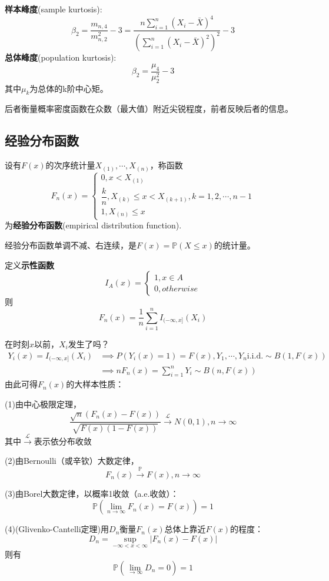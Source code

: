 \documentclass{ctexbook}
\begin{document}
\begin{definition}
    \textbf{样本峰度}(sample kurtosis):
    $$\hat{\beta}_2=\frac{m_{n,4}}{m_{n,2}^{2}}-3=\frac{n\sum_{i=1}^{n}(X_i-\bar{X})^4}{\left(\sum_{i=1}^n(X_i-\bar{X})^2\right)^{2}}-3$$
    \textbf{总体峰度}(population kurtosis):
    $$\beta_2=\frac{\mu_4}{\mu_2^{2}}-3$$
    其中$\mu_k$为总体的k阶中心矩。

    后者衡量概率密度函数在众数（最大值）附近尖锐程度，前者反映后者的信息。
\end{definition}

\subsection{经验分布函数}

\begin{definition}
    设有$F(x)$的次序统计量$X_{(1)},\cdots,X_{(n)}$，称函数
    $$F_n(x)=\begin{cases}
        0,x<X_{(1)}\\
        \dfrac{k}{n},X_{(k)}\le x <X_{(k+1)},k=1,2,\cdots,n-1\\
        1,X_{(n)}\le x
    \end{cases}$$
    为\textbf{经验分布函数}(empirical distribution function).
\end{definition}

经验分布函数单调不减、右连续，是$F(x)=\mathbb{P} (X\le x)$的统计量。

定义\textbf{示性函数}
$$I_A(x)=\begin{cases}
    1,x\in A\\
    0,otherwise
\end{cases}$$
则
$$F_n(x)=\frac{1}{n}\sum_{i=1}^n I_{(-\infty,x]}(X_i)$$

在时刻$x$以前，$X_i$发生了吗？
\begin{align*}
    Y_i(x)=I_{(-\infty,x]}(X_i)&\implies P(Y_i(x)=1)=F(x),Y_1,\cdots,Y_n \text{i.i.d.}\sim B(1,F(x))\\
    &\implies nF_n(x)=\sum_{i=1}^n Y_i\sim B(n,F(x))
\end{align*}
由此可得$F_n(x)$的大样本性质：
\begin{theorem}
    (1)由中心极限定理，
    $$\frac{\sqrt{n}(F_n(x)-F(x))}{\sqrt{F(x)(1-F(x))}}\xrightarrow{\mathcal{L}}N(0,1),n\to\infty$$
    其中$\xrightarrow{\mathcal{L}}$表示依分布收敛

    (2)由Bernoulli（或辛钦）大数定律，
    $$F_n(x)\xrightarrow{\mathbb{P}}F(x),n\to\infty$$

    (3)由Borel大数定律，以概率1收敛（a.e.收敛）：
    $$\mathbb{P} (\lim_{n\to\infty}F_n(x)=F(x))=1$$

    (4)(Glivenko-Cantelli定理)用$D_n$衡量$F_n(x)$总体上靠近$F(x)$的程度：
    $$D_n=\sup_{-\infty<x<\infty}|F_n(x)-F(x)|$$
    则有
    $$\mathbb{P} (\lim_{\to\infty}D_n=0)=1$$
\end{theorem}
\end{document}
